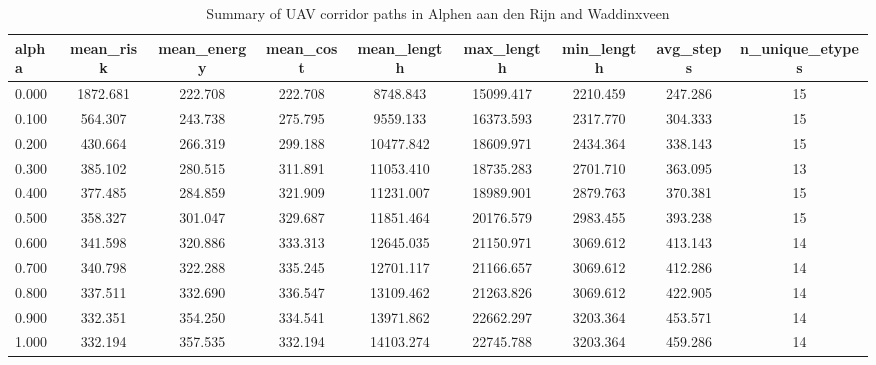 \begin{table}
\caption{Summary of UAV corridor paths in Alphen aan den Rijn and Waddinxveen}
\label{tab:alphen_waddinxveen_summary}
\begin{tabular}{lcccccccc}
\toprule
alpha & mean_risk & mean_energy & mean_cost & mean_length & max_length & min_length & avg_steps & n_unique_etypes \\
\midrule
0.000 & 1872.681 & 222.708 & 222.708 & 8748.843 & 15099.417 & 2210.459 & 247.286 & 15 \\
0.100 & 564.307 & 243.738 & 275.795 & 9559.133 & 16373.593 & 2317.770 & 304.333 & 15 \\
0.200 & 430.664 & 266.319 & 299.188 & 10477.842 & 18609.971 & 2434.364 & 338.143 & 15 \\
0.300 & 385.102 & 280.515 & 311.891 & 11053.410 & 18735.283 & 2701.710 & 363.095 & 13 \\
0.400 & 377.485 & 284.859 & 321.909 & 11231.007 & 18989.901 & 2879.763 & 370.381 & 15 \\
0.500 & 358.327 & 301.047 & 329.687 & 11851.464 & 20176.579 & 2983.455 & 393.238 & 15 \\
0.600 & 341.598 & 320.886 & 333.313 & 12645.035 & 21150.971 & 3069.612 & 413.143 & 14 \\
0.700 & 340.798 & 322.288 & 335.245 & 12701.117 & 21166.657 & 3069.612 & 412.286 & 14 \\
0.800 & 337.511 & 332.690 & 336.547 & 13109.462 & 21263.826 & 3069.612 & 422.905 & 14 \\
0.900 & 332.351 & 354.250 & 334.541 & 13971.862 & 22662.297 & 3203.364 & 453.571 & 14 \\
1.000 & 332.194 & 357.535 & 332.194 & 14103.274 & 22745.788 & 3203.364 & 459.286 & 14 \\
\bottomrule
\end{tabular}
\end{table}
